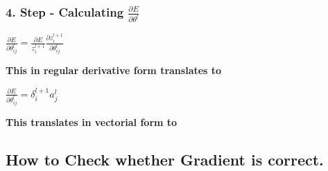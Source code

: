 \subsubsection{\texorpdfstring{4. Step - Calculating
\(\frac{\partial E}{\partial \theta^{l}}\)}{4. Step - Calculating \textbackslash{}frac\{\textbackslash{}partial E\}\{\textbackslash{}partial \textbackslash{}theta\^{}\{l\}\}}}\label{step---calculating-fracpartial-epartial-thetal}

\(\frac{\partial E}{\partial \theta^{l}_{ij}}=\frac{\partial E}{z^{l+1}_{i}} \frac{\partial z^{l+1}_{i}}{\partial \theta^{l}_{ij}}\)

\textbf{This in regular derivative form translates to}

\(\frac{\partial E}{\partial \theta^{l}_{ij}}=\delta^{l+1}_{i}a^{l}_{j}\)

\textbf{This translates in vectorial form to}

\subsection{How to Check whether Gradient is
correct.}\label{how-to-check-whether-gradient-is-correct.}
